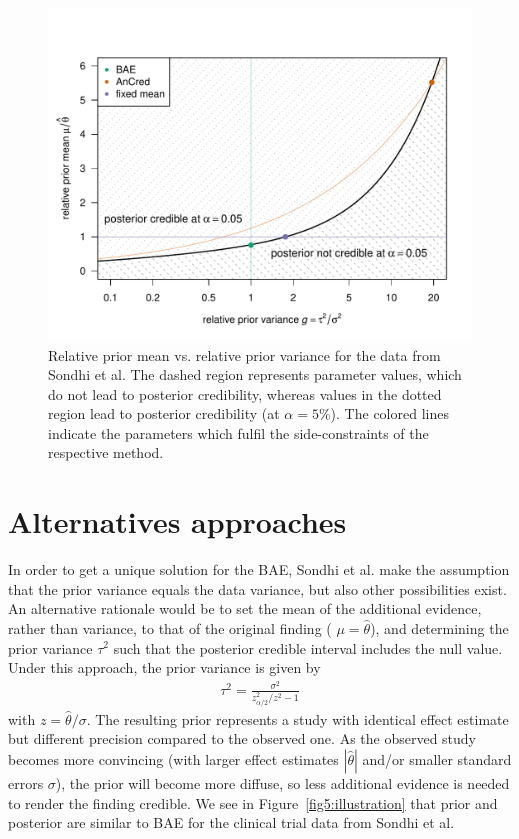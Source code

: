 \begin{figure}[!htb]
\begin{knitrout}
\color{fgcolor}
\includegraphics[width=\maxwidth]{images/paper5/plot-2d-1}
\end{knitrout}
\caption{Relative prior mean vs. relative prior variance for the data from
  Sondhi et al. The dashed region represents parameter values, which do not lead
  to posterior credibility, whereas values in the dotted region lead to
  posterior credibility (at $\alpha = 5\%$). The
  colored lines indicate the parameters which fulfil the side-constraints of the
  respective method.}
\label{fig5:priospace}
\end{figure}

\section{Alternatives approaches}
In order to get a unique solution for the BAE, Sondhi et al. make the assumption
that the prior variance equals the data variance, but also other possibilities
exist. An alternative rationale would be to set the mean of the additional
evidence, rather than variance, to that of the original finding (\ie
$\mu = \hat{\theta}$), and determining the prior variance $\tau^{2}$ such that
the posterior credible interval includes the null value. Under this approach,
the prior variance is given by
\begin{align*}
  \tau^{2} = \frac{\sigma^{2}}{z_{\scriptscriptstyle \alpha/2}^2/z^2 - 1}
\end{align*}
with $z = \hat{\theta}/\sigma$. The resulting prior represents a study with
identical effect estimate but different precision compared to the observed one.
As the observed study becomes more convincing (with larger effect estimates
$|\hat{\theta}|$ and/or smaller standard errors $\sigma$), the prior will become
more diffuse, so less additional evidence is needed to render the finding
credible. We see in Figure~\ref{fig5:illustration} that prior and posterior are
similar to BAE for the clinical trial data from Sondhi et al.


